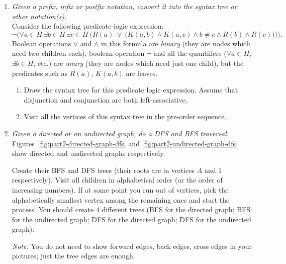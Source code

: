 \documentclass[a4paper,12pt]{article}
\begin{document}
\begin{enumerate}
\item {\small \em  Given a prefix, infix or postfix notation, convert it into the syntax tree or other notation(s).}\\
Consider the following predicate-logic expression: 
\[ \neg \bigg( \forall a \in H\ \exists b \in H\ \exists c \in H\ \Big( R(a)\ \vee\  \big(K(a,b) \wedge K(a,c) \wedge b \neq c \wedge R(b) \wedge R(c)\big) \Big) \bigg). \]
Boolean operations $\vee$ and $\wedge$ in this formula are {\em binary} (they 
are nodes which need two children each), 
boolean operation $\neg$ and all the quantifiers ($\forall a \in H$, $\exists b \in H$, etc.) are {\em unary} (they are nodes which need just one child), 
but the predicates such as $R(a)$, $K(a,b)$ are leaves. 

\begin{enumerate}
\item Draw the syntax tree for this predicate logic expression. Assume that disjunction and conjunction are both left-associative. 
\item Visit all the vertices of this syntax tree in the pre-order sequence. 
\end{enumerate}


\item {\small \em  Given a directed or an undirected
graph, do a DFS and BFS traversal.}\\
Figures~\ref{fig:part2-directed-graph-dfs} and \ref{fig:part2-undirected-graph-dfs}
show directed and undirected graphs respectively. 

Create their BFS and DFS trees (their roots are in vertices $A$ and $1$ respectively). 
Visit all children in alphabetical order (or the order of increasing numbers). 
If at some point you run out of vertices, pick the alphabetically smallest
vertex among the remaining ones and start the process. 
You should create $4$ different trees (BFS for the directed graph; 
BFS for the undirected graph; DFS for the directed graph; DFS for the undirected
graph). 

{\em Note.} You do not need to show forward edges, back edges, cross edges in your
pictures; just the tree edges are enough.


\end{enumerate}
\end{document}
